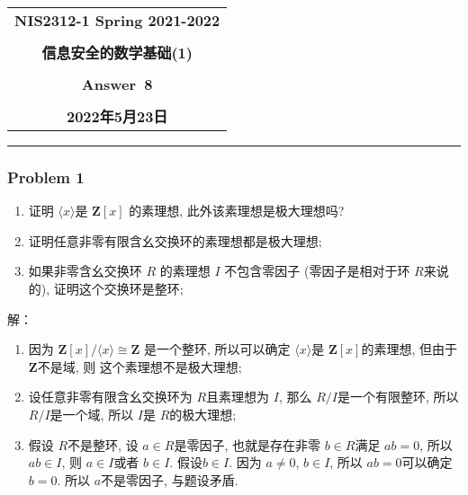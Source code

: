 \documentclass[a4paper,12pt]{ctexart}
\newcommand{\Z}{\mathbf{Z}}
\begin{document}
  \begin{center}

  \vspace{-0.3in}
  \begin{tabular}{c}
    \textbf{\Large NIS2312-1 Spring 2021-2022} \\
    \textbf{\Large  } \\
    \textbf{\Large  信息安全的数学基础(1)} \\
    \textbf{\Large  } \\
    \textbf{\Large  Answer~8} \\
    \textbf{\Large  } \\
    \textbf{\Large 2022年5月23日} \\
  \end{tabular}
  \end{center}
  \noindent
  \rule{\linewidth}{0.4pt}

\subsubsection*{Problem 1}
    \begin{enumerate}
      \item 证明 $ \langle x\rangle $是 $ \Z[x] $ 的素理想, 此外该素理想是极大理想吗?
      \item 证明任意非零有限含幺交换环的素理想都是极大理想;
      \item 如果非零含幺交换环 $ R $ 的素理想 $ I $ 不包含零因子 (零因子是相对于环 $ R $来说的), 证明这个交换环是整环;
    \end{enumerate}

    解：\begin{enumerate}
      \item 因为 $ \Z[x]/\langle x\rangle\cong\Z $ 是一个整环, 所以可以确定 $ \langle x\rangle $是 $ \Z[x] $的素理想, 但由于 $ \Z $不是域, 则 这个素理想不是极大理想;
      \item 设任意非零有限含幺交换环为 $ R $且素理想为 $ I $, 那么 $ R/I $是一个有限整环, 所以 $ R/I $是一个域, 所以 $ I $是 $ R $的极大理想;
      \item 假设 $ R $不是整环, 设 $ a\in R $是零因子, 也就是存在非零 $ b\in R $满足 $ ab=0 $, 所以 $ ab\in I $, 则 $ a\in I $或者  $ b\in I $. 假设$ b\in I $. 
      因为 $ a\neq 0 $, $ b\in I $, 所以 $ ab=0 $可以确定 $ b=0 $. 所以 $ a $不是零因子, 与题设矛盾. 
    \end{enumerate}
\end{document}
